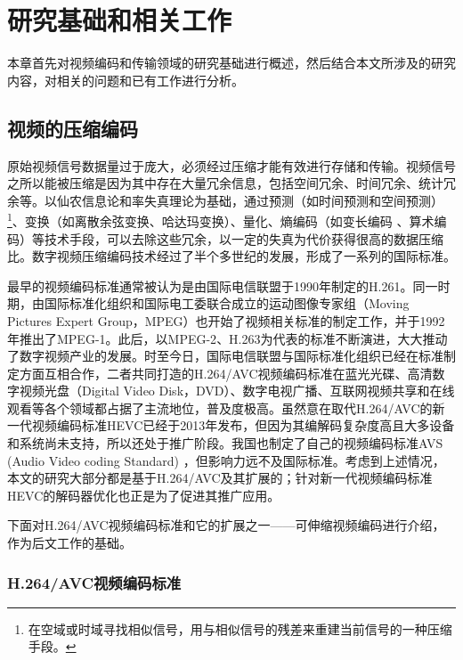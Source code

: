 \chapter{研究基础和相关工作}

本章首先对视频编码和传输领域的研究基础进行概述，然后结合本文所涉及的研究内容，对相关的问题和已有工作进行分析。

\section{视频的压缩编码}

原始视频信号数据量过于庞大，必须经过压缩才能有效进行存储和传输。视频信号之所以能被压缩是因为其中存在大量冗余信息，包括空间冗余、时间冗余、统计冗余等\supercite{Gao-book-2010}。以仙农信息论\supercite{Shannon-1948}和率失真理论\supercite{Berger-book-1984}为基础，通过预测（如时间预测和空间预测）\footnote{在空域或时域寻找相似信号，用与相似信号的残差来重建当前信号的一种压缩手段。}、变换（如离散余弦变换\supercite{Rao-1990}、哈达玛变换\supercite{Pratt-1969}）、量化\supercite{Gray-TIT1997}、熵编码（如变长编码\supercite{Huffman-1952} 、算术编码\supercite{Rissanen-1979}）等技术手段，可以去除这些冗余，以一定的失真为代价获得很高的数据压缩比。数字视频压缩编码技术经过了半个多世纪的发展，形成了一系列的国际标准。

最早的视频编码标准通常被认为是由国际电信联盟于1990年制定的H.261\supercite{H.261}。同一时期，由国际标准化组织和国际电工委联合成立的运动图像专家组（Moving Pictures Expert Group，MPEG）也开始了视频相关标准的制定工作，并于1992年推出了MPEG-1\supercite{MPEG1}。此后，以MPEG-2\supercite{MPEG2}、H.263\supercite{H.263}为代表的标准不断演进，大大推动了数字视频产业的发展。时至今日，国际电信联盟与国际标准化组织已经在标准制定方面互相合作，二者共同打造的H.264/AVC视频编码标准在蓝光光碟、高清数字视频光盘（Digital Video Disk，DVD）、数字电视广播、互联网视频共享和在线观看等各个领域都占据了主流地位，普及度极高。虽然意在取代H.264/AVC的新一代视频编码标准HEVC已经于2013年发布，但因为其编解码复杂度高且大多设备和系统尚未支持，所以还处于推广阶段。我国也制定了自己的视频编码标准AVS (Audio Video coding Standard) \supercite{AVS}，但影响力远不及国际标准。考虑到上述情况，本文的研究大部分都是基于H.264/AVC及其扩展的；针对新一代视频编码标准HEVC的解码器优化也正是为了促进其推广应用。

下面对H.264/AVC视频编码标准和它的扩展之一——可伸缩视频编码进行介绍，作为后文工作的基础。

\subsection{H.264/AVC视频编码标准}

